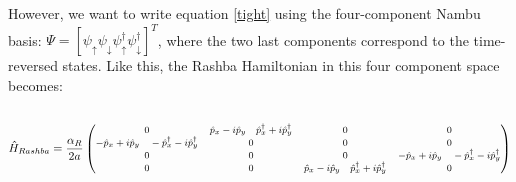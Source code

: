 \documentclass[letterpaper,12pt]{article}
\begin{document}
However, we want to write equation \ref{tight} using the four-component Nambu basis: $\Psi = [\psi_\uparrow \psi_\downarrow \psi_\uparrow^\dagger \psi_\downarrow^\dagger]^T$, where the two last components correspond to the time-reversed states. Like this, the Rashba Hamiltonian in this four component space becomes:\\ \\ 
\vspace{.5cm}
\begin{equation}
\footnotesize
\hat{H}_{Rashba} = \frac{\alpha_R}{2a}
    \begin{pmatrix}
    0 & \hat{p}_x - i\hat{p}_y\quad\hat{p}_x^\dagger + i\hat{p}_y^\dagger & 0 & 0\\
    -\hat{p}_x + i\hat{p}_y\quad-\hat{p}_x^\dagger - i\hat{p}_y^\dagger & 0 & 0 & 0\\
    0 & 0 & 0 & -\hat{p}_x + i\hat{p}_y\quad-\hat{p}_x^\dagger - i\hat{p}_y^\dagger\\
    0 & 0 & \hat{p}_x - i\hat{p}_y\quad\hat{p}_x^\dagger + i\hat{p}_y^\dagger & 0
    \end{pmatrix}
\end{equation}
\vspace{.5cm}
\end{document}
